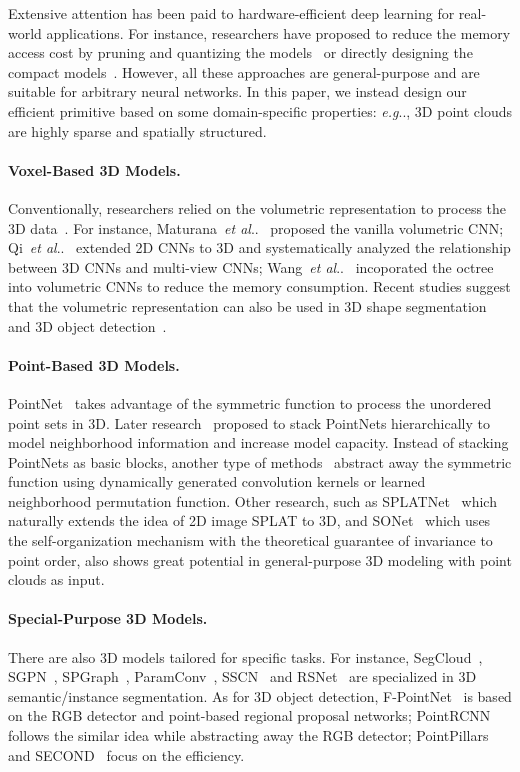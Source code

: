 \documentclass{article}
\makeatletter
\DeclareRobustCommand\onedot{\futurelet\@let@token\@onedot}
\def\@onedot{\ifx\@let@token.\else.\null\fi\xspace}
\def\eg{\emph{e.g}\onedot} \def\Eg{\emph{E.g}\onedot}
\def\etal{\emph{et al}\onedot}
\newcommand{\myparagraph}[1]{\vspace{-6pt}\paragraph{#1}}
\makeatother
\begin{document}
Extensive attention has been paid to hardware-efficient deep learning for real-world applications. For instance, researchers have proposed to reduce the memory access cost by pruning and quantizing the models~\cite{Han:2015pn,Han:2016uf,He:2018am,Lin:2016fp,Zhou:2017it,Wang:2019ha} or directly designing the compact models~\cite{Iandola:2016sq,Howard:2017mn,Sandler:2018ir,Howard:2019sf,Zhang:2018md,Ma:2018sn}. However, all these approaches are general-purpose and are suitable for arbitrary neural networks. In this paper, we instead design our efficient primitive based on some domain-specific properties: \eg, 3D point clouds are highly sparse and spatially structured.


\myparagraph{Voxel-Based 3D Models.}

Conventionally, researchers relied on the volumetric representation to process the 3D data~\cite{Wu:2015mn}. For instance, Maturana~\etal~\cite{Maturana:2015vn} proposed the vanilla volumetric CNN; Qi~\etal~\cite{Qi:2016vm} extended 2D CNNs to 3D and systematically analyzed the relationship between 3D CNNs and multi-view CNNs; Wang~\etal~\cite{Wang:2017td} incoporated the octree into volumetric CNNs to reduce the memory consumption. Recent studies suggest that the volumetric representation can also be used in 3D shape segmentation~\cite{Tatarchenko:2017oc,Wang:2019vs, Le:2018pg} and 3D object detection~\cite{Zhou:2018vn}.

\myparagraph{Point-Based 3D Models.}

PointNet~\cite{Qi:2017vq} takes advantage of the symmetric function to process the unordered point sets in 3D. Later research~\cite{Qi:2017tf,Klokov:2017te, Wang:2018dg} proposed to stack PointNets hierarchically to model neighborhood information and increase model capacity. Instead of stacking PointNets as basic blocks, another type of methods~\cite{Li:2018tp,Lan:2019ge, Xu:2018sp} abstract away the symmetric function using dynamically generated convolution kernels or learned neighborhood permutation function. Other research, such as SPLATNet~\cite{Su:2018sp}  which naturally extends the idea of 2D image SPLAT to 3D, and SONet~\cite{Li:2018so} which uses the self-organization mechanism with the theoretical guarantee of invariance to point order, also shows great potential in general-purpose 3D modeling with point clouds as input. 

\myparagraph{Special-Purpose 3D Models.}

There are also 3D models tailored for specific tasks. For instance, SegCloud~\cite{Tchapmi:2017sc}, SGPN~\cite{Wang:2018sg}, SPGraph~\cite{Landrieu:2018sp}, ParamConv~\cite{Wang:2018pc}, SSCN~\cite{Graham:2018ss} and RSNet~\cite{Huang:2018rs} are specialized in 3D semantic/instance segmentation. As for 3D object detection, F-PointNet~\cite{Qi:2018fd} is based on the RGB detector and point-based regional proposal networks; PointRCNN~\cite{Shi:2019pr} follows the similar idea while abstracting away the RGB detector; PointPillars~\cite{Lang:2019pp} and SECOND~\cite{Yan:2018se} focus on the efficiency.
\end{document}
